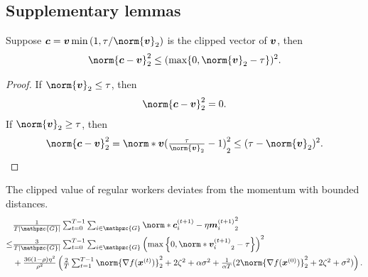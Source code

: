 \documentclass{article}
\newcommand{\gset}{\ensuremath{{\mathpzc{G}}}}
\begin{document}
\subsection{Supplementary lemmas}
\begin{lemma}
  [clipping]\label{lemma:clipping}
  Suppose $\cc=\vv\min\left(1, \tau/\norm{\vv}_2 \right)$ is the clipped vector of $\bm{v}$, then
  \begin{align*}
    \norm{\cc - \vv}_2^2 \le  (\max\{0, \norm{\vv}_2 - \tau\} )^2.
  \end{align*}
\end{lemma}
\begin{proof}
  If $\norm{\vv}_2 \le \tau$, then
  \begin{align*}
    \norm{\cc - \vv}_2^2 = 0.
  \end{align*}
  If $\norm{\vv}_2 \ge \tau$, then
  \begin{align*}
    \norm{\cc - \vv}_2^2 = \norm*{\vv ( \tfrac{\tau}{\norm{\vv}_2} - 1 ) }_2^2
    \le (\tau - \norm{\vv}_2)^2.
  \end{align*}
\end{proof}
\begin{lemma}
  \label{lemma:ci_mi}
  The clipped value of regular workers deviates from the momentum with bounded distances.
  \begin{align*}
        & \tfrac{1}{T|\gset|}\tsum_{t=0}^{T-1}\tsum_{i\in\gset}\norm*{ \cc_i^{(t+1)}  - \eta \mm_i^{(t+1)}  }_2^2           \\
    \le &
    \tfrac{3}{T|\gset|}\tsum_{t=0}^{T-1}\tsum_{i\in\gset} \left(\max\left\{0, \norm*{\vv_i^{(t+1)}}_2-\tau\right\}\right)^2 \\
        & +
    \tfrac{36(1-\rho)\eta^2}{\rho^2} \left(\tfrac{2}{T}\tsum_{t=1}^{T-1} \norm{\nabla f(\xx^{(t)}) }_2^2
    +  2  \zeta^2
    + \alpha\sigma^2
    + \tfrac{1}{\alpha T}(2\norm{\nabla f(\xx^{(0)}) }_2^2
      + 2 \zeta^2
      + \sigma^2) \right).
  \end{align*}
\end{lemma}
\end{document}
